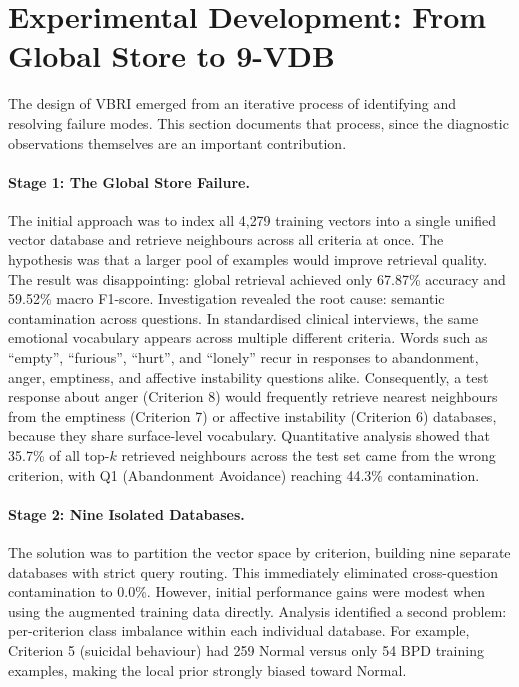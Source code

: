 \documentclass[11pt]{article}
\newcommand{\vbri}{VBRI}
\begin{document}
\section{Experimental Development: From Global Store to 9-VDB}\label{sec:journey}

The design of \vbri{} emerged from an iterative process of identifying and resolving failure
modes. This section documents that process, since the diagnostic observations themselves are an
important contribution.

\paragraph{Stage 1: The Global Store Failure.}
The initial approach was to index all 4,279 training vectors into a single unified vector
database and retrieve neighbours across all criteria at once. The hypothesis was that a larger
pool of examples would improve retrieval quality. The result was disappointing: global retrieval
achieved only 67.87\% accuracy and 59.52\% macro F1-score. Investigation revealed the root
cause: semantic contamination across questions. In standardised clinical interviews, the same
emotional vocabulary appears across multiple different criteria. Words such as ``empty'',
``furious'', ``hurt'', and ``lonely'' recur in responses to abandonment, anger, emptiness, and
affective instability questions alike. Consequently, a test response about anger (Criterion 8)
would frequently retrieve nearest neighbours from the emptiness (Criterion 7) or affective
instability (Criterion 6) databases, because they share surface-level vocabulary. Quantitative
analysis showed that 35.7\% of all top-$k$ retrieved neighbours across the test set came from
the wrong criterion, with Q1 (Abandonment Avoidance) reaching 44.3\% contamination.

\paragraph{Stage 2: Nine Isolated Databases.}
The solution was to partition the vector space by criterion, building nine separate databases
with strict query routing. This immediately eliminated cross-question contamination to 0.0\%.
However, initial performance gains were modest when using the augmented training data directly.
Analysis identified a second problem: per-criterion class imbalance within each individual
database. For example, Criterion 5 (suicidal behaviour) had 259 Normal versus only 54 BPD
training examples, making the local prior strongly biased toward Normal.
\end{document}
